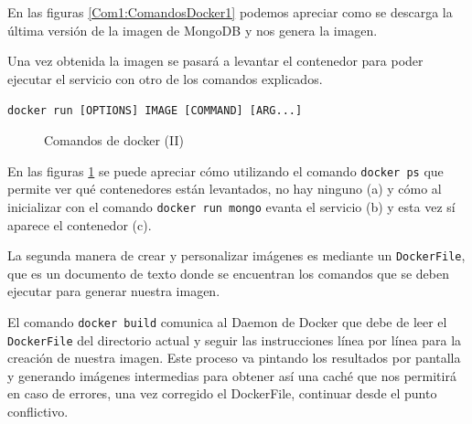 En las figuras \ref{Com1:ComandosDocker1} podemos apreciar como se descarga la última versión de la imagen de MongoDB y nos genera la imagen. 

Una vez obtenida la imagen se pasará a levantar el contenedor para poder ejecutar el servicio con otro de los comandos explicados. 

\begin{center}
\texttt{docker run [OPTIONS] IMAGE [COMMAND] [ARG...]}
\end{center}
\pagebreak 

\begin{figure}[htb]
\begin{center}
\caption{Comandos de docker (II)}
\label{Com2:ComandosDocker2}
\end{center}
\end{figure}


En las figuras \ref{Com2:ComandosDocker2} se puede apreciar cómo utilizando el comando \texttt{docker ps} que
permite ver qué contenedores están levantados, no hay ninguno (a) y cómo al inicializar con el comando  \texttt{docker run mongo} evanta el servicio (b) y esta vez sí aparece el contenedor (c).

La segunda manera de crear y personalizar imágenes es mediante un \texttt{DockerFile}, que es un documento de texto donde se encuentran los comandos que se deben ejecutar para generar nuestra imagen.

El comando \texttt{docker build} comunica al Daemon de Docker que debe de leer el \texttt{DockerFile} del directorio actual y seguir las instrucciones línea por línea para la creación de nuestra imagen. Este proceso va pintando los resultados por pantalla y generando imágenes intermedias para obtener así una caché que nos permitirá en caso de errores, una vez corregido el DockerFile, continuar desde el punto conflictivo. 

